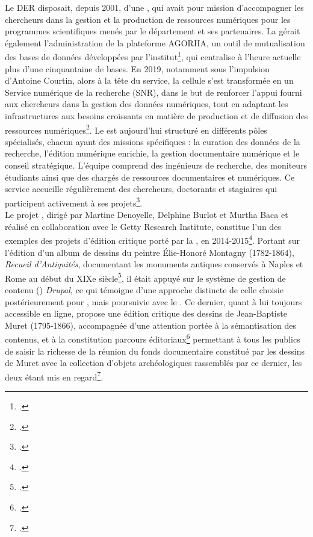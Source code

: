 Le DER disposait, depuis 2001, d’une \cid, qui avait pour mission d’accompagner les chercheurs dans la gestion et la production de ressources numériques pour les programmes scientifiques menés par le département et ses partenaires. La \cid gérait également l’administration de la plateforme AGORHA, un outil de mutualisation des bases de données développées par l’institut\footcite{courtin_rapport_2019}, qui centralise à l’heure actuelle plus d’une cinquantaine de bases. 
En 2019, notamment sous l’impulsion d’Antoine Courtin, alors à la tête du service, la cellule s’est transformée en un Service numérique de la recherche (SNR), dans le but de renforcer l’appui fourni aux chercheurs dans la gestion des données numériques, tout en adaptant les infrastructures aux besoins croissants en matière de production et de diffusion des ressources numériques\footcite{inha_service_nodate}.
Le \snr est aujourd’hui structuré en différents pôles spécialisés, chacun ayant des missions spécifiques : la curation des données de la recherche, l’édition numérique enrichie, la gestion documentaire numérique et le conseil stratégique. L’équipe comprend des ingénieurs de recherche, des moniteurs étudiants ainsi que des chargés de ressources documentaires et numériques. Ce service accueille régulièrement des chercheurs, doctorants et stagiaires qui participent activement à ses projets\footcite{nurra_presentation_2023}.
\newline
{}\\

Le projet , dirigé par Martine Denoyelle, Delphine Burlot et Murtha Baca et réalisé en collaboration avec le Getty Research Institute, constitue l’un des exemples des projets d’édition critique porté par la \cid, en 2014-2015\footcite[p.13]{courtin_rapport_2019}. 
Portant sur l’édition d’un album de dessins du peintre Élie-Honoré Montagny (1782-1864), \textit{Recueil d’Antiquités}, documentant les monuments antiques conservés à Naples et Rome au début du XIXe siècle\footcite{inha_digital_nodate}, il était appuyé sur le système de gestion de contenu (\cms) \textit{Drupal}, ce qui témoigne d’une approche distincte de celle choisie postérieurement pour \pense, mais poursuivie avec le . 
Ce dernier, quant à lui toujours accessible en ligne, propose une édition critique des dessins de Jean-Baptiste Muret (1795-1866), accompagnée d’une attention portée à la sémantisation des contenus, et à la constitution parcours éditoriaux\footcite[p.49]{courtin_rapport_2019} permettant à tous les publics de saisir la richesse de la réunion du fonds documentaire constitué par les dessins de Muret avec la collection d’objets archéologiques rassemblés par ce dernier, les deux étant mis en regard\footcite{noauthor_a_nodate}.

